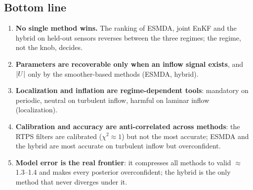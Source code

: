 \subsection{Bottom line}
\begin{enumerate}[nosep]
  \item \textbf{No single method wins.} The ranking of ESMDA, joint EnKF and the hybrid on
        held-out sensors reverses between the three regimes; the regime, not the knob,
        decides.
  \item \textbf{Parameters are recoverable only when an inflow signal exists}, and
        $|U|$ only by the smoother-based methods (ESMDA, hybrid).
  \item \textbf{Localization and inflation are regime-dependent tools}: mandatory on
        periodic, neutral on turbulent inflow, harmful on laminar inflow (localization).
  \item \textbf{Calibration and accuracy are anti-correlated across methods}: the
        RTPS filters are calibrated ($\chi^2\approx1$) but not the most accurate; ESMDA
        and the hybrid are most accurate on turbulent inflow but overconfident.
  \item \textbf{Model error is the real frontier}: it compresses all methods to
        valid $\approx$1.3--1.4 and makes every posterior overconfident; the hybrid is
        the only method that never diverges under it.
\end{enumerate}
